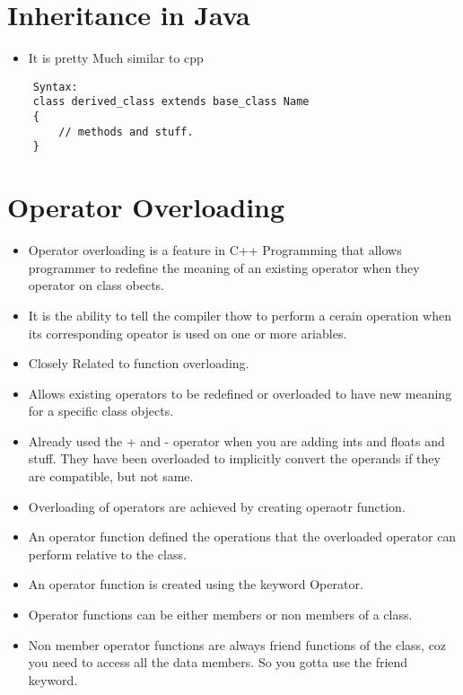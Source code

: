 \documentclass[11pt]{article}
\begin{document}
% 

\section{Inheritance in Java}
\begin{itemize}
	\item It is pretty Much similar to cpp
\end{itemize}

\begin{verbatim}
	Syntax: 
	class derived_class extends base_class Name
	{
		// methods and stuff. 
	}
\end{verbatim}


\section{Operator Overloading}

\begin{itemize}
	\item Operator overloading is a feature in C++ Programming that allows programmer to redefine the meaning of an existing operator when they operator on class obects. 
	\item It is the ability to tell the compiler thow to perform a cerain operation when its corresponding opeator is used on one or more ariables.
	\item Closely Related to function overloading. 
	\item Allows existing operators to be redefined or overloaded to have new meaning for a specific class objects. 
	\item Already used the + and - operator when you are adding ints and floats and stuff. They have been overloaded to implicitly convert the operands if they are compatible, but not same. 
	\item Overloading of operators are achieved by creating operaotr function. 
	\item An operator function defined the operations that the overloaded operator can perform relative to the class. 
	\item An operator function is created using the keyword Operator. 
	\item Operator functions can be either members or non members of a class. 
	\item Non member operator functions are always friend functions of the class, coz you need to access all the data members. So you gotta use the friend keyword.  
\end{itemize}
\end{document}
